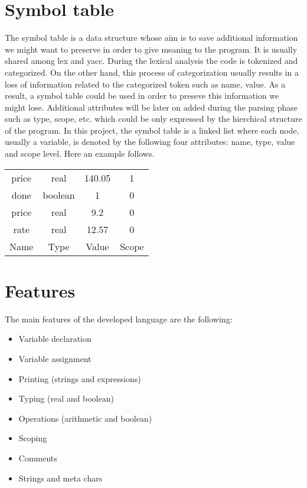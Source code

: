 \documentclass[12pt]{article}
\begin{document}
\section{Symbol table}
The symbol table is a data structure whose aim is to save additional information we might want to preserve in order to give meaning to the program. It is usually shared among lex and yacc. During the lexical analysis the code is tokenized and categorized. On the other hand, this process of categorization usually results in a loss of information related to the categorized token such as name, value. As a result, a symbol table could be used in order to preseve this information we might lose. Additional attributes will be later on added during the parsing phase such as type, scope, etc. which could be only expressed by the hierchical structure of the program. In this project, the symbol table is a linked list where each node, usually a variable, is denoted by the following four attributes: name, type, value and scope level. Here an example follows.
\vspace{0.3cm}
\begin{table}[h!]
\centering
\begin{tabular}{c|c|c|c}
price & real & 140.05 & 1 \\
done & boolean & 1 & 0 \\
price & real & 9.2 & 0 \\
rate & real & 12.57 & 0 \\
\hline
Name & Type & Value & Scope
\end{tabular}
\end{table}
\vspace{1.7cm}





\section{Features}
The main features of the developed language are the following:
\begin{itemize}
\item Variable declaration
\item Variable assignment
\item Printing (strings and expressions)
\item Typing (real and boolean)
\item Operations (arithmetic and boolean)
\item Scoping
\item Comments
\item Strings and meta chars
\end{itemize}
\end{document}
